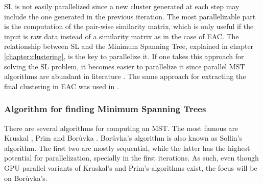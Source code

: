 SL is not easily parallelized since a new cluster generated at each step may include the one generated in the previous iteration.
The most parallelizable part is the computation of the pair-wise similarity matrix, which is only useful if the input is raw data instead of a similarity matrix as in the case of EAC.
The relationship between SL and the Minimum Spanning Tree, explained in chapter \ref{chapter:clustering}, is the key to parallelize it.
If one takes this approach for solving the SL problem, it becomes easier to parallelize it since parallel MST algorithms are abundant in literature \cite{Vineet2009,rostrup2013fast,Sousa2015}.
The same approach for extracting the final clustering in EAC was used in \cite{Fred2002}.


\subsubsection{Algorithm for finding Minimum Spanning Trees}
There are several algorithms for computing an MST.
The most famous are Kruskal \citep{kruskal1956shortest}, Prim \citep{prim1957shortest} and Borůvka \citep{boruuvka1926jistem}.
Borůvka's algorithm is also known as Sollin's algorithm.
The first two are mostly sequential, while the latter has the highest potential for parallelization, specially in the first iterations.
As such, even though GPU parallel variants of Kruskal's \citep{rostrup2013fast} and Prim's \citep{Wang2011} algorithms exist, the focus will be on Borůvka's.%

